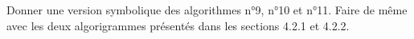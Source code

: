 Donner une version symbolique des algorithmes n°9, n°10 et n°11. Faire de même avec les deux algorigrammes présentés dans les sections 4.2.1 et 4.2.2.